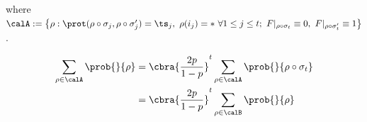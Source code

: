 \newcommand{\A}{\left\{
    \rho: \prot(\rho\circ \sigma_j, \rho \circ \sigma_j')= \ts_j,\ 
    \rho(i_j) = *\ \forall 1 \leq j \leq t;\
    F|_{\rho\circ \sigma_t} \equiv 0,\
    F|_{\rho \circ \sigma_t'} \equiv 1  
    \right\}}

\newcommand{\Bk}[1]{\{
    \rho: \prot(\rho(i_{j+1} = \ldots = i_t = *) ), \rho(i_j \to \bar{a_j}, i_{j+1} = \ldots = i_t = *))= \ts_j,\ 
    \rho(i_j) = a_j\ \forall #1 \leq j \leq t;\
    F|_{\rho} \equiv 0,\
    F|_{\rho(i_t \to \bar{a_t})} \equiv 1  
    \}}

\newcommand{\Ck}[1]{\{
    \rho: \prot(\rho, \rho(i_k \to \bar{a_k})= \ts_k;\prot(\rho\circ \sigma_{k+1 \to j}, \rho(i_k \to \bar{a_k})\circ \sigma_{k+1 \to j}')= \ts_j, \rho(i_j) = * \forall #1+1 \leq j \leq t ;
    \rho(i_k) = a_k ,
    F|_{\rho\circ \sigma_{k+1 \to t}} \equiv 0,
    F|_{\rho\circ \sigma_{k+1 \to t}'} \equiv 1  
    \}}
\newcommand{\Ckprime}[1]{\{
    \rho: \prot(\rho(i_k \to a_k), \rho)= \ts_k;\prot(\rho(i_k \to a_k)\circ \sigma_{k+1 \to j}, \rho(i_k \to a_k)\circ \sigma_{k+1 \to j}')= \ts_j, \forall #1+1 \leq j \leq t ;
    \rho(i_k) = \bar{a_k} ,
    F|_{\rho\circ(i_k \to a_k) \sigma_{k+1 \to t}} \equiv 0,
    F|_{\rho\circ(i_k \to a_k) \sigma_{k+1 \to t}'} \equiv 1 
    \}}
    
\newcommand{\calD}{\mathcal{D}}

\newcommand{\Dk}[1]{\{
    \rho: \prot(\rho(i_j \to a_j)\circ \sigma_{k+1 \to j}, \rho\circ \sigma_{k+1 \to j}')= \ts_j, \forall #1 \leq j \leq t ;
    \rho(i_k) = a_k ,
    F|_{\rho\circ \sigma_{k+1 \to t}} \equiv 0,
    F|_{\rho(i_j \to \bar{a_j})\circ \sigma_{k+1 \to t}'} \equiv 1  
    \}}
\newcommand{\Dkprime}[1]{\{
    \rho: \prot(\rho\circ \sigma_{k+1 \to j}, \rho(i_j \to \bar{a_j})\circ \sigma_{k+1 \to j}')= \ts_j, \forall #1+1 \leq j \leq t ;
    \rho(i_k) = a_k ,
    F|_{\rho\circ \sigma_{k+1 \to t}} \equiv 0,
    F|_{\rho(i_j \to \bar{a_j})\circ \sigma_{k+1 \to t}'} \equiv 1  
    \}}


where $\calA := \A$.


\begin{align*}
        \sum_{\rho \in \calA} \prob{}{\rho} 
        &= \cbra{\frac{2p}{1-p}}^t \sum_{\rho \in \calA} \prob{}{\rho \circ \sigma_t}\\
        &= \cbra{\frac{2p}{1-p}}^t  \sum_{\rho \in \calB} \prob{}{\rho} 
        \\
\end{align*}        

